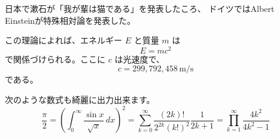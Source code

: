 \documentclass[uplatex,dvipdfmx]{jlreq}
\begin{document}
日本で漱石が「我が輩は猫である」を発表したころ、
ドイツではAlbert Einsteinが特殊相対論を発表した。

この理論によれば、エネルギー $E$ と質量 $m$ は
\begin{equation}
  E = mc^{2}
\end{equation}
で関係づけられる。ここに $c$ は光速度で、
\begin{equation}
  c = 299{,}792{,}458 \, \mathrm{m/s}
\end{equation}
である。

次のような数式も綺麗に出力出来ます。
\[
  \frac{\pi}{2} =
  \left( \int_{0}^{\infty} \frac{\sin x}{\sqrt{x}} \, dx \right)^{2} =
  \sum_{k=0}^{\infty} \frac{(2k)!}{2^{2k}(k!)^2} \frac{1}{2k+1} =
  \prod_{k=1}^{\infty} \frac{4k^2}{4k^2 - 1}
\]
\end{document}
